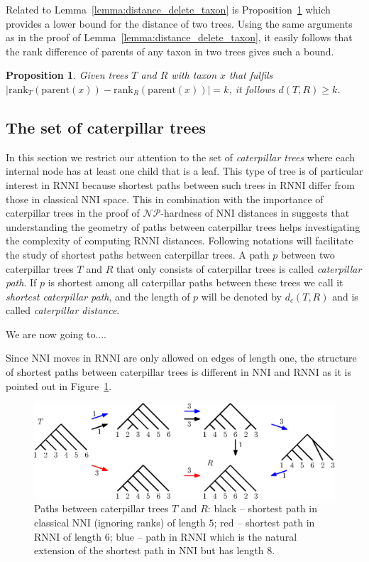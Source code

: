 \documentclass{amsart}
\newcommand{\np}{\mathcal{NP}}
\newcommand{\parent}{\mathrm{parent}}
\newcommand{\rank}{\mathrm{rank}}
\newcommand{\nni}{\mathrm{NNI}}
\newcommand{\rnni}{\mathrm{RNNI}}
\newtheorem{proposition}[definition]{Proposition}
\begin{document}
Related to Lemma~\ref{lemma:distance_delete_taxon} is Proposition~\ref{proposition:lower_bound_distance} which provides a lower bound for the distance of two trees.
Using the same arguments as in the proof of Lemma~\ref{lemma:distance_delete_taxon}, it easily follows that the rank difference of parents of any taxon in two trees gives such a bound.

\begin{proposition}
    Given trees $T$ and $R$ with taxon $x$ that fulfils $|\rank_T(\parent(x)) - \rank_R(\parent(x))| = k$, it follows $d(T,R) \geq k$.
    \label{proposition:lower_bound_distance}
\end{proposition}

\subsection{The set of caterpillar trees}
\label{section:caterpillar_convex}

In this section we restrict our attention to the set of \emph{caterpillar trees} where each internal node has at least one child that is a leaf.
This type of tree is of particular interest in $\rnni$ because shortest paths between such trees in $\rnni$ differ from those in classical $\nni$ space.
This in combination with the importance of caterpillar trees in the proof of $\np$-hardness of $\nni$ distances in \autocite{jiang2000} suggests that understanding the geometry of paths between caterpillar trees helps investigating the complexity of computing $\rnni$ distances.
Following notations will facilitate the study of shortest paths between caterpillar trees.
A path $p$ between two caterpillar trees $T$ and $R$ that only consists of caterpillar trees is called \emph{caterpillar path}.
If $p$ is shortest among all caterpillar paths between these trees we call it \emph{shortest caterpillar path}, and the length of $p$ will be denoted by $d_c(T,R)$ and is called \emph{caterpillar distance}.

We are now going to....

Since $\nni$ moves in $\rnni$ are only allowed on edges of length one, the structure of shortest paths between caterpillar trees is different in $\nni$ and $\rnni$ as it is pointed out in Figure~\ref{fig:NNI_vs_RNNI}.


\begin{figure}[H]
	\centering
	\includegraphics[width=\textwidth]{NNI_vs_RNNI}
	\caption{Paths between caterpillar trees $T$ and $R$: black -- shortest path in classical $\nni$ (ignoring ranks) of length $5$; red -- shortest path in $\rnni$ of length $6$; blue -- path in $\rnni$ which is the natural extension of the shortest path in $\nni$ but has length $8$.}
	\label{fig:NNI_vs_RNNI}
\end{figure}
\end{document}
